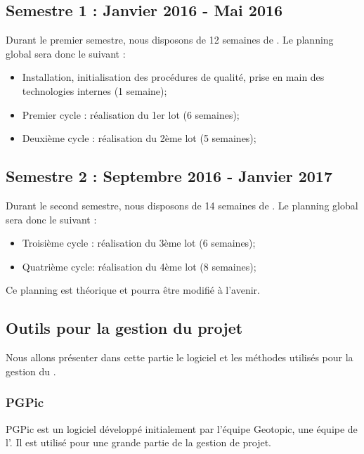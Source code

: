 \subsection*{Semestre 1 : Janvier 2016 - Mai 2016}

Durant le premier semestre, nous disposons de 12 semaines de \PICCourt. Le planning global sera donc le suivant : 
\begin{itemize}
\item Installation, initialisation des procédures de qualité, prise en main des technologies internes (1 semaine);
\item Premier cycle : réalisation du 1er lot (6 semaines);
\item Deuxième cycle : réalisation du 2ème lot (5 semaines);
\end{itemize}

\subsection*{Semestre 2 : Septembre 2016 - Janvier 2017}

Durant le second semestre, nous disposons de 14 semaines de \PICCourt. Le planning global sera donc le suivant : 
\begin{itemize}
\item Troisième cycle : réalisation du 3ème lot (6 semaines);
\item Quatrième cycle: réalisation du 4ème lot (8 semaines);\\
\end{itemize}

Ce planning est théorique et pourra être modifié à l'avenir. 

\subsection{Outils pour la gestion du projet}
\label{outils_gestion}

Nous allons présenter dans cette partie le logiciel et les méthodes utilisés pour la gestion du \PICCourt. \\

\subsubsection*{PGPic}

PGPic est un logiciel développé initialement par l'équipe Geotopic, une équipe \PICCourt de l'\INSACourt. Il est utilisé pour une grande partie de la gestion de projet. \\

